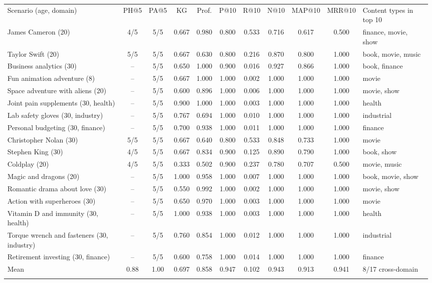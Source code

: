 \setlength{\tabcolsep}{3pt}
\begin{tabular*}{\hsize}{@{\extracolsep{\fill}}lcccccccccl@{}}
\toprule
Scenario (age, domain) & PH@5 & PA@5 & KG & Prof. & P@10 & R@10 & N@10 & MAP@10 & MRR@10 & Content types in top 10 \\
\colrule
James Cameron (20) & 4/5 & 5/5 & 0.667 & 0.980 & 0.800 & 0.533 & 0.716 & 0.617 & 0.500 & finance, movie, show \\
Taylor Swift (20) & 5/5 & 5/5 & 0.667 & 0.630 & 0.800 & 0.216 & 0.870 & 0.800 & 1.000 & book, movie, music \\
Business analytics (30) & -- & 5/5 & 0.650 & 1.000 & 0.900 & 0.016 & 0.927 & 0.866 & 1.000 & book, finance \\
Fun animation adventure (8) & -- & 5/5 & 0.667 & 1.000 & 1.000 & 0.002 & 1.000 & 1.000 & 1.000 & movie \\
Space adventure with aliens (20) & -- & 5/5 & 0.600 & 0.896 & 1.000 & 0.006 & 1.000 & 1.000 & 1.000 & movie, show \\
Joint pain supplements (30, health) & -- & 5/5 & 0.900 & 1.000 & 1.000 & 0.003 & 1.000 & 1.000 & 1.000 & health \\
Lab safety gloves (30, industry) & -- & 5/5 & 0.767 & 0.694 & 1.000 & 0.010 & 1.000 & 1.000 & 1.000 & industrial \\
Personal budgeting (30, finance) & -- & 5/5 & 0.700 & 0.938 & 1.000 & 0.011 & 1.000 & 1.000 & 1.000 & finance \\
Christopher Nolan (30) & 5/5 & 5/5 & 0.667 & 0.640 & 0.800 & 0.533 & 0.848 & 0.733 & 1.000 & movie \\
Stephen King (30) & 4/5 & 5/5 & 0.667 & 0.834 & 0.900 & 0.125 & 0.890 & 0.790 & 1.000 & book, show \\
Coldplay (20) & 4/5 & 5/5 & 0.333 & 0.502 & 0.900 & 0.237 & 0.780 & 0.707 & 0.500 & movie, music \\
Magic and dragons (20) & -- & 5/5 & 1.000 & 0.958 & 1.000 & 0.007 & 1.000 & 1.000 & 1.000 & book, movie, show \\
Romantic drama about love (30) & -- & 5/5 & 0.550 & 0.992 & 1.000 & 0.002 & 1.000 & 1.000 & 1.000 & movie, show \\
Action with superheroes (30) & -- & 5/5 & 0.650 & 0.970 & 1.000 & 0.003 & 1.000 & 1.000 & 1.000 & movie \\
Vitamin D and immunity (30, health) & -- & 5/5 & 1.000 & 0.938 & 1.000 & 0.003 & 1.000 & 1.000 & 1.000 & health \\
Torque wrench and fasteners (30, industry) & -- & 5/5 & 0.760 & 0.854 & 1.000 & 0.012 & 1.000 & 1.000 & 1.000 & industrial \\
Retirement investing (30, finance) & -- & 5/5 & 0.600 & 0.758 & 1.000 & 0.014 & 1.000 & 1.000 & 1.000 & finance \\
\colrule
Mean & 0.88 & 1.00 & 0.697 & 0.858 & 0.947 & 0.102 & 0.943 & 0.913 & 0.941 & 8/17 cross-domain \\
\botrule
\end{tabular*}
